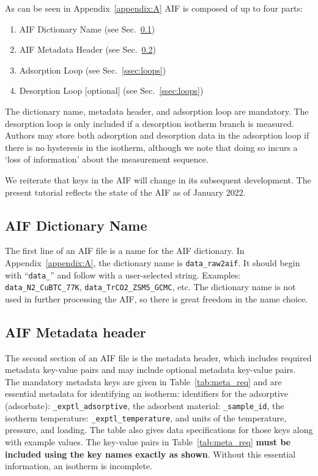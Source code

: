 \documentclass[preprint,pre,showkeys,12pt,superscriptaddress,nofootinbib,endfloats*]{revtex4-1}
\begin{document}
As can be seen in Appendix~\ref{appendix:A} AIF is composed of up to four parts:

\begin{enumerate}
\item AIF Dictionary Name (see Sec.~\ref{ssec:name})
\item AIF Metadata Header (see Sec.~\ref{ssec:metadata})
\item Adsorption Loop (see Sec.~\ref{ssec:loops})
\item Desorption Loop [optional] (see Sec.~\ref{ssec:loops})
\end{enumerate}

The dictionary name, metadata header, and adsorption loop are mandatory. The desorption loop is only included if a desorption isotherm branch is measured. Authors may store both adsorption and desorption data in the adsorption loop if there is no hysteresis in the isotherm, although we note that doing so incurs a `loss of information' about the measurement sequence.

We reiterate that keys in the AIF will change in its subsequent development. The present tutorial reflects the state of the AIF as of January 2022.

\subsection{AIF Dictionary Name}\label{ssec:name}

The first line of an AIF file is a name for the AIF dictionary. In Appendix~\ref{appendix:A}, the dictionary name is \verb!data_raw2aif!. It should begin with ``\verb!data_!'' and follow with a user-selected string. Examples: \verb!data_N2_CuBTC_77K!, \verb!data_TrCO2_ZSM5_GCMC!, etc. The dictionary name is not used in further processing the AIF, so there is great freedom in the name choice.

\subsection{AIF Metadata header}\label{ssec:metadata}

The second section of an AIF file is the metadata header, which includes required metadata key-value pairs and may include optional metadata key-value pairs. The mandatory metadata keys are given in Table~\ref{tab:meta_req} and are essential metadata for identifying an isotherm: identifiers for the adsorptive (adsorbate): \verb!_exptl_adsorptive!, the adsorbent material: \verb!_sample_id!, the isotherm temperature: \verb!_exptl_temperature!, and units of the temperature, pressure, and loading. The table also gives data specifications for those keys along with example values. The key-value pairs in Table~\ref{tab:meta_req} {\bf must be included using the key names exactly as shown}. Without this essential information, an isotherm is incomplete.
\end{document}
